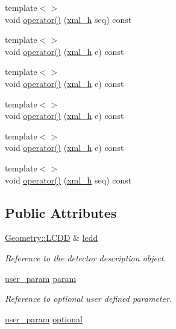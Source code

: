 \begin{DoxyCompactItemize}
\item 
{\footnotesize template$<$$>$ }\\void \hyperlink{struct_d_d4hep_1_1_converter_a5b13161e909e467c6cf9435b2c97315a}{operator()} (\hyperlink{class_d_d4hep_1_1_x_m_l_1_1_handle__t}{xml\_\-h} seq) const
\item 
{\footnotesize template$<$$>$ }\\void \hyperlink{struct_d_d4hep_1_1_converter_aea99ac077bd50a1b4fe352613b32ae2e}{operator()} (\hyperlink{class_d_d4hep_1_1_x_m_l_1_1_handle__t}{xml\_\-h} e) const
\item 
{\footnotesize template$<$$>$ }\\void \hyperlink{struct_d_d4hep_1_1_converter_a8dc46a004a139a5a5d924fea83230135}{operator()} (\hyperlink{class_d_d4hep_1_1_x_m_l_1_1_handle__t}{xml\_\-h} e) const
\item 
{\footnotesize template$<$$>$ }\\void \hyperlink{struct_d_d4hep_1_1_converter_a8753edb2d4ce141f26316a8268381450}{operator()} (\hyperlink{class_d_d4hep_1_1_x_m_l_1_1_handle__t}{xml\_\-h} e) const
\item 
{\footnotesize template$<$$>$ }\\void \hyperlink{struct_d_d4hep_1_1_converter_a08c0d7669b5fa73c187be97bd8c1b709}{operator()} (\hyperlink{class_d_d4hep_1_1_x_m_l_1_1_handle__t}{xml\_\-h} e) const
\item 
{\footnotesize template$<$$>$ }\\void \hyperlink{struct_d_d4hep_1_1_converter_a32541c316bf853ed606f586d56bc5597}{operator()} (\hyperlink{class_d_d4hep_1_1_x_m_l_1_1_handle__t}{xml\_\-h} seq) const
\end{DoxyCompactItemize}
\subsection*{Public Attributes}
\begin{DoxyCompactItemize}
\item 
\hyperlink{class_d_d4hep_1_1_geometry_1_1_l_c_d_d}{Geometry::LCDD} \& \hyperlink{struct_d_d4hep_1_1_converter_acefaa7bdcbf210e64d96db04f90b5c9c}{lcdd}
\begin{DoxyCompactList}\small\item\em Reference to the detector description object. \item\end{DoxyCompactList}\item 
\hyperlink{struct_d_d4hep_1_1_converter_a13a876ea9cfcadf85a3dadd32e97a834}{user\_\-param} \hyperlink{struct_d_d4hep_1_1_converter_ac6d7d17feb235d19267a40c8e6dfb2ca}{param}
\begin{DoxyCompactList}\small\item\em Reference to optional user defined parameter. \item\end{DoxyCompactList}\item 
\hyperlink{struct_d_d4hep_1_1_converter_a13a876ea9cfcadf85a3dadd32e97a834}{user\_\-param} \hyperlink{struct_d_d4hep_1_1_converter_a884a538646c4dd3043e3d6234db2cc0d}{optional}
\end{DoxyCompactItemize}


